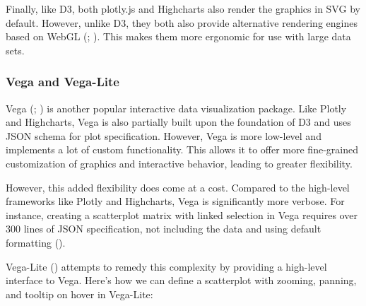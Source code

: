 \documentclass[
]{book}
\begin{document}
Finally, like D3, both plotly.js and Highcharts also render the graphics in SVG by default. However, unlike D3, they both also provide alternative rendering engines based on WebGL (; ). This makes them more ergonomic for use with large data sets.

\subsubsection{Vega and Vega-Lite}\label{vega-and-vega-lite}

Vega (; ) is another popular interactive data visualization package. Like Plotly and Highcharts, Vega is also partially built upon the foundation of D3 and uses JSON schema for plot specification. However, Vega is more low-level and implements a lot of custom functionality. This allows it to offer more fine-grained customization of graphics and interactive behavior, leading to greater flexibility.

However, this added flexibility does come at a cost. Compared to the high-level frameworks like Plotly and Highcharts, Vega is significantly more verbose. For instance, creating a scatterplot matrix with linked selection in Vega requires over 300 lines of JSON specification, not including the data and using default formatting ().

Vega-Lite () attempts to remedy this complexity by providing a high-level interface to Vega. Here's how we can define a scatterplot with zooming, panning, and tooltip on hover in Vega-Lite:

\label{vegalite-plot}
\end{document}
